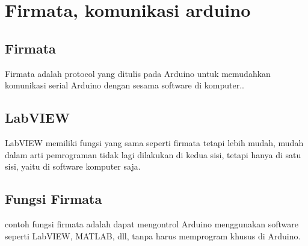 
\section{Firmata, komunikasi arduino}

	\subsection{Firmata}
	Firmata adalah protocol yang ditulis pada Arduino untuk memudahkan komunikasi serial Arduino dengan sesama software di komputer..
	
	
	\subsection{LabVIEW}
	LabVIEW memiliki fungsi yang sama seperti firmata tetapi lebih mudah, mudah dalam arti pemrograman tidak lagi dilakukan di kedua sisi,
	tetapi hanya di satu sisi, yaitu di software komputer saja.
	
	\subsection{Fungsi Firmata}
	contoh fungsi firmata adalah dapat mengontrol Arduino menggunakan software seperti LabVIEW, MATLAB, dll, tanpa harus memprogram khusus di Arduino.